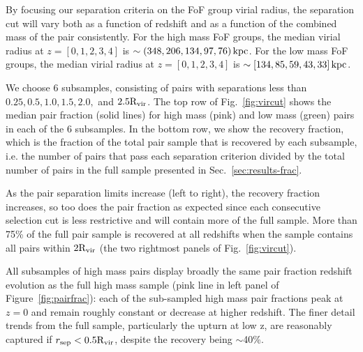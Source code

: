 \documentclass[linenumbers,twocolumn]{aastex631}
\newcommand{\Rvir}{\ensuremath{\rm R_{vir}}}
\begin{document}
    By focusing our separation criteria on the FoF group virial radius, the separation cut will vary both as a function of redshift and as a function of the combined mass of the pair consistently.
    For the high mass FoF groups, the median virial radius at $z=[0,1,2,3,4]$ is $\sim(348, 206, 134, 97, 76)\mathrm{\,kpc}$. 
    For the low mass FoF groups, the median virial radius at $z=[0,1,2,3,4]$ is $\sim[134, 85, 59, 43, 33]\mathrm{\,kpc}$.    
    
    We choose 6 subsamples, consisting of pairs with separations less than $0.25, 0.5, 1.0, 1.5, 2.0,$ and $2.5\Rvir$. 
    The top row of Fig.~\ref{fig:vircut} shows the median pair fraction (solid lines) for high mass (pink) and low mass (green) pairs in each of the 6 subsamples. 
    In the bottom row, we show the recovery fraction, which is the fraction of the total pair sample that is recovered by each subsample, i.e. the number of pairs that pass each separation criterion divided by the total number of pairs in the full sample presented in Sec.~\ref{sec:results-frac}.

    As the pair separation limits increase (left to right), the recovery fraction increases, so too does the pair fraction as expected since each consecutive selection cut is less restrictive and will contain more of the full sample. 
    More than 75\% of the full pair sample is recovered at all redshifts when the sample contains all pairs within $2\Rvir$ (the two rightmost panels of Fig.~\ref{fig:vircut}).

    All subsamples of high mass pairs display broadly the same pair fraction redshift evolution as the full high mass sample (pink line in left panel of Figure~\ref{fig:pairfrac}): each of the sub-sampled high mass pair fractions peak at $z=0$ and remain roughly constant or decrease at higher redshift. 
    The finer detail trends from the full sample, particularly the upturn at low z, are reasonably captured if $r_{\mathrm{sep}} < 0.5 \Rvir$, despite the recovery being $\sim$40\%. 
\end{document}
